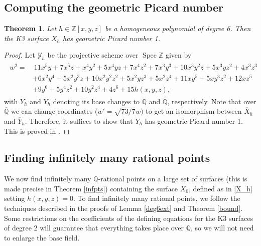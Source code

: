 \documentclass[11pt]{amsart}
\newcommand{\QQ}{\mathbb{Q}}
\newcommand{\ZZ}{\mathbb{Z}}
\theoremstyle{plain}
\newtheorem{theorem}[lemma]{Theorem}
\theoremstyle{remark}
\begin{document}
\subsection{Computing the geometric Picard number}\label{rho1}


\begin{theorem} \label{piconeh}
     Let $h\in \ZZ[x,y,z]$ be a homogeneous polynomial of degree 6. Then the K3 surface $X_h$ has geometric Picard number 1. 
\end{theorem}
\begin{proof}

Let $\mathcal{Y}_h$ be the projective scheme over $\operatorname{Spec} \ZZ$ given by
 \begin{align*}
\begin{split}
w^2 = & \ 
 11x^5y+7x^5z+x^4y^2+5x^4yz+7x^4z^2+7x^3y^3+10x^3y^2z+5x^3yz^2+4x^3z^3 \\
& +6x^2y^4+5x^2y^3z+10x^2y^2z^2+5x^2yz^3+5x^2z^4+11xy^5+5xy^3z^2+12xz^5 \\
& +9y^6+5y^4z^2+10y^2z^4+4z^6+15h(x,y,z),
\end{split}
\end{align*}
with $Y_h$ and $\overline{Y}_h$ denoting its base changes to $\QQ$ and $\overline{\QQ}$, respectively. Note that over $\overline{\QQ}$ we can change coordinates ($w'=\sqrt{73/7}w)$ to get an isomorphism between $\overline{X}_h$ and $\overline{Y}_h$. Therefore, it suffices to show that $Y_h$ has geometric Picard number 1. This is proved in \cite[Theorem 29 and Corollary 30]{eljah}. 
\end{proof}

\subsection{Finding infinitely many rational points} \label{infsec} 

We now find infinitely many $\QQ$-rational points on a large set of surfaces (this is made precise in Theorem \ref{infpts}) containing the surface $X_0$, defined as in \eqref{X_h} setting $h(x,y,z)=0$. To find infinitely many rational points, we follow the techniques described in the proofs of Lemma \ref{deg6ext} and Theorem \ref{bound}. Some restrictions on the coefficients of the defining equations for the K3 surfaces of degree 2 will guarantee that everything takes place over $\QQ$, so we will not need to enlarge the base field. 
\end{document}
